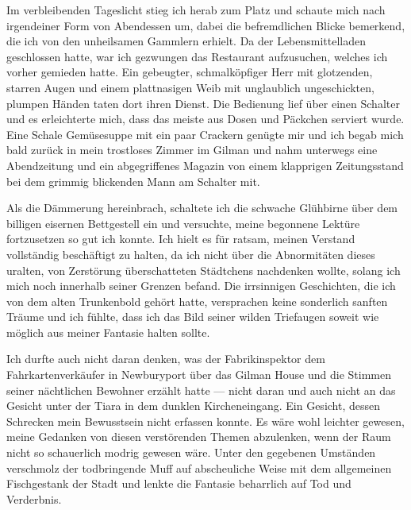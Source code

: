Im verbleibenden Tageslicht stieg ich herab zum Platz und schaute mich nach irgendeiner Form von Abendessen um, dabei die befremdlichen Blicke bemerkend, die ich von den unheilsamen Gammlern erhielt. Da der Lebensmittelladen geschlossen hatte, war ich gezwungen das Restaurant aufzusuchen, welches ich vorher gemieden hatte. Ein gebeugter, schmalköpfiger Herr mit glotzenden, starren Augen und einem plattnasigen Weib mit unglaublich ungeschickten, plumpen Händen taten dort ihren Dienst. Die Bedienung lief über einen Schalter und es erleichterte mich, dass das meiste aus Dosen und Päckchen serviert wurde. Eine Schale Gemüsesuppe mit ein paar Crackern genügte mir und ich begab mich bald zurück in mein trostloses Zimmer im Gilman und nahm unterwegs eine Abendzeitung und ein abgegriffenes Magazin von einem klapprigen Zeitungsstand bei dem grimmig blickenden Mann am Schalter mit.

Als die Dämmerung hereinbrach, schaltete ich die schwache Glühbirne über dem billigen eisernen Bettgestell ein und versuchte, meine begonnene Lektüre fortzusetzen so gut ich konnte. Ich hielt es für ratsam, meinen Verstand vollständig beschäftigt zu halten, da ich nicht über die Abnormitäten dieses uralten, von Zerstörung überschatteten Städtchens nachdenken wollte, solang ich mich noch innerhalb seiner Grenzen befand. Die irrsinnigen Geschichten, die ich von dem alten Trunkenbold gehört hatte, versprachen keine sonderlich sanften Träume und ich fühlte, dass ich das Bild seiner wilden Triefaugen soweit wie möglich aus meiner Fantasie halten sollte.

Ich durfte auch nicht daran denken, was der Fabrikinspektor dem Fahrkartenverkäufer in Newburyport über das Gilman House und die Stimmen seiner nächtlichen Bewohner erzählt hatte --- nicht daran und auch nicht an das Gesicht unter der Tiara in dem dunklen Kircheneingang. Ein Gesicht, dessen Schrecken mein Bewusstsein nicht erfassen konnte. Es wäre wohl leichter gewesen, meine Gedanken von diesen verstörenden Themen abzulenken, wenn der Raum nicht so schauerlich modrig gewesen wäre. Unter den gegebenen Umständen verschmolz der todbringende Muff auf abscheuliche Weise mit dem allgemeinen Fischgestank der Stadt und lenkte die Fantasie beharrlich auf Tod und Verderbnis.

